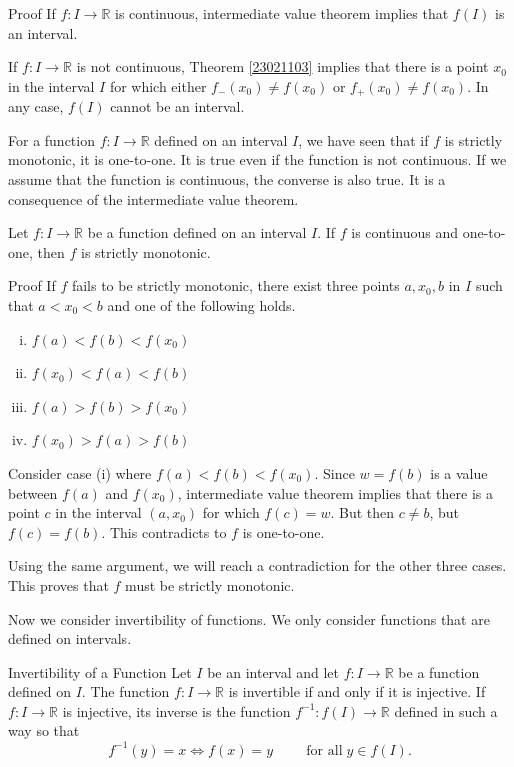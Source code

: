 \begin{example}
\begin{myproof}{Proof}
If $f:I\rightarrow \mathbb{R}$ is continuous, intermediate value theorem implies that $f(I)$ is an interval.

If $f:I\rightarrow \mathbb{R}$ is not continuous, Theorem \ref{23021103} implies that there is a point $x_0$ in the interval $I$ for which either $f_{-}(x_0)\neq f(x_0)$ or $f_+(x_0)\neq f(x_0)$. In any case, $f(I)$ cannot be an interval.
\end{myproof}

For a function $f:I\rightarrow\mathbb{R}$  defined on an interval $I$, we have seen that if $f$ is strictly monotonic, it is one-to-one. It is true even if the function is not continuous. If we assume that the function is continuous, the converse is also true.
It is a consequence of the intermediate value theorem.
\begin{theorem}[label=23021108]{}
Let $f:I\to \mathbb{R}$ be a function defined on an interval $I$. If $f$ is continuous and one-to-one, then $f$ is strictly monotonic. 
\end{theorem}
\begin{myproof}{Proof}
If $f$  fails to be strictly monotonic, there   exist three points $a, x_0, b$ in $I$ such that $a<x_0<b$ and one of the following holds.
\begin{enumerate}[(i)]
\item  $f(a)<f(b)<f(x_0)$
\item $f(x_0)<f(a)<f(b)$
\item $f(a)>f(b)>f(x_0)$
\item $f(x_0)>f(a)>f(b)$

\end{enumerate}Consider case (i) where $f(a)<f(b)<f(x_0)$. Since $w=f(b)$ is a value between $f(a)$ and $f(x_0)$, intermediate value theorem implies that there is a point $c$ in the interval $(a, x_0)$ for which $f(c)=w$. But then $c\neq b$, but $f(c)=f(b)$. This contradicts to $f$ is one-to-one.

Using the same argument, we will reach a contradiction for the other three cases. 
This proves that $f$ must be strictly monotonic.
\end{myproof}

Now we consider invertibility of functions. We only consider functions that are defined on intervals.
\begin{definition}{Invertibility of a Function}
Let  $I$ be an interval and let $f:I\rightarrow\mathbb{R}$ be a function defined on $I$. The function $f:I\rightarrow\mathbb{R}$ is invertible if and only if it is injective. If $f:I\rightarrow\mathbb{R}$ is injective,   its inverse is the function $f^{-1}:f(I)\rightarrow\mathbb{R}$ defined in such a way so that
\[f^{-1}(y)=x\iff f(x)=y\hspace{1cm}\text{for all}\;y\in f(I).\]
\end{definition}


\end{example}
